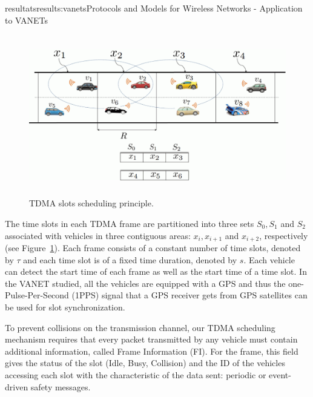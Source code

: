 \documentclass{ra2016}
\begin{document}
\begin{module}{resultats}{results:vanets}{Protocols and Models for Wireless Networks - Application to VANETs}
\begin{figure}[!htbp]
    \begin{center}
        \includegraphics[height=7cm,width=14cm]{IMG/DTMAC_idea.pdf}
    \end{center}
    \caption{TDMA slots scheduling principle.}
    \label{figc:DTMAC_idea}
\end{figure}

The time slots in each TDMA frame are partitioned into three sets $S_0, S_1$ and $S_2$ associated with vehicles in three 
contiguous areas: $x_i, x_{i+1}$ and $x_{i+2}$, respectively (see Figure~\ref{figc:DTMAC_idea}). Each frame consists of a 
constant number of time slots, denoted by $\tau$ and each time slot is of a fixed time duration, denoted by $s$. Each vehicle 
can detect the start time of each frame as well as the start time of a time slot. In the VANET studied, all the vehicles are 
equipped with a GPS and thus the one-Pulse-Per-Second (1PPS) signal that a GPS receiver gets from GPS 
satellites can be used for slot synchronization. 

To prevent collisions on the transmission channel, our TDMA scheduling mechanism requires that every packet transmitted by 
any vehicle must contain additional information, called Frame Information (FI).
For the frame, this field gives the status of the slot (Idle, Busy, Collision) and 
the ID of the vehicles accessing each slot with the characteristic of the data 
sent: periodic or event-driven safety messages.


\end{module}
\end{document}
